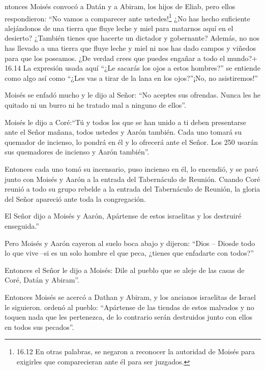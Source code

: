  ntonces Moisés convocó a Datán y a Abiram, los hijos de
Eliab, pero ellos respondieron: ``No vamos a comparecer ante
ustedes!\footnote{16.12 En otras palabras, se negaron a reconocer la
  autoridad de Moisés para exigirles que comparecieran ante él para ser
  juzgados.}  ¿No has hecho suficiente alejándonos de una
tierra que fluye leche y miel para matarnos aquí en el desierto?
¿También tienes que hacerte un dictador y gobernante? 
Además, no nos has llevado a una tierra que fluye leche y miel ni nos
has dado campos y viñedos para que los poseamos. ¿De verdad crees que
puedes engañar a todo el mundo?+ 16.14 La expresión usada aquí ``¿Le
sacarás los ojos a estos hombres?'' se entiende como algo así como
``¿Les vas a tirar de la lana en los ojos?''¡No, no asistiremos!''

 Moisés se enfadó mucho y le dijo al Señor: ``No aceptes
sus ofrendas. Nunca les he quitado ni un burro ni he tratado mal a
ninguno de ellos''.

 Moisés le dijo a Coré:``Tú y todos los que se han unido a
ti deben presentarse ante el Señor mañana, todos ustedes y Aarón
también.  Cada uno tomará su quemador de incienso, lo
pondrá en él y lo ofrecerá ante el Señor. Los 250 usarán sus quemadores
de incienso y Aarón también''.

 Entonces cada uno tomó su incensario, puso incienso en él,
lo encendió, y se paró junto con Moisés y Aarón a la entrada del
Tabernáculo de Reunión.  Cuando Coré reunió a todo su grupo
rebelde a la entrada del Tabernáculo de Reunión, la gloria del Señor
apareció ante toda la congregación.

 El Señor dijo a Moisés y Aarón,  Apártense de
estos israelitas y los destruiré enseguida.''

 Pero Moisés y Aarón cayeron al suelo boca abajo y dijeron:
``Dios -- Diosde todo lo que vive --si es un solo hombre el que peca,
¿tienes que enfadarte con todos?''

 Entonces el Señor le dijo a Moisés:  Dile al
pueblo que se aleje de las casas de Coré, Datán y Abiram''.

 Entonces Moisés se acercó a Dathan y Abiram, y los
ancianos israelitas de Israel le siguieron.  ordenó al
pueblo: ``Apártense de las tiendas de estos malvados y no toquen nada
que les pertenezca, de lo contrario serán destruidos junto con ellos en
todos sus pecados''.

